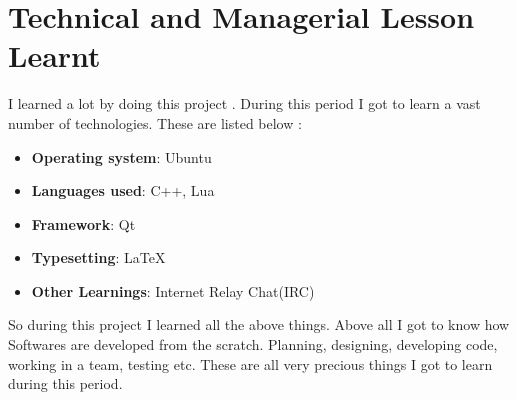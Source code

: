 \section{Technical and Managerial Lesson Learnt}
I learned a lot by doing this project . During this period I got to learn a vast 
number of technologies. These are listed below :
\begin{itemize}
\item {\bf{Operating system}}: Ubuntu
\item {\bf{Languages used}}: C++, Lua
\item {\bf{Framework}}: Qt 
\item {\bf{Typesetting}}: \LaTeX
\item {\bf{Other Learnings}}: Internet Relay Chat(IRC)

\end{itemize}

So during this project I learned all the above things. Above all I got to know 
how Softwares are developed from the scratch. Planning, designing, developing code, 
working in a team, testing etc. These are all very precious things I got to learn 
during this period.  
